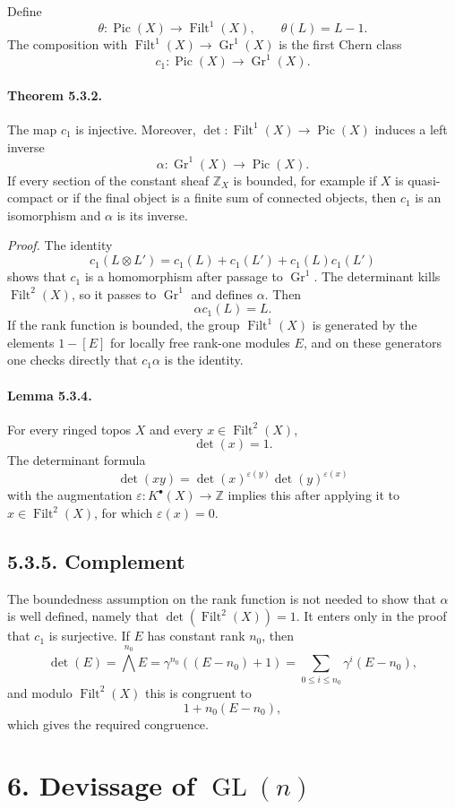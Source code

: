 \documentclass[12pt]{article}
\newcommand{\ZZ}{\mathbb Z}
\newcommand{\Pic}{\operatorname{Pic}}
\newcommand{\Gr}{\operatorname{Gr}}
\newcommand{\Filt}{\operatorname{Filt}}
\newcommand{\detm}{\det}
\newcommand{\Gl}{\operatorname{GL}}
\newcommand{\longto}{\longrightarrow}
\newcommand{\eps}{\varepsilon}
\begin{document}
Define
\[
\theta:\Pic(X)\longto\Filt^1(X),\qquad \theta(L)=L-1.
\]
The composition with $\Filt^1(X)\to\Gr^1(X)$ is the first Chern class
\[
c_1:\Pic(X)\longto\Gr^1(X).
\]

\paragraph{Theorem 5.3.2.}
The map $c_1$ is injective. Moreover, $\detm:\Filt^1(X)\to\Pic(X)$ induces a left inverse
\[
\alpha:\Gr^1(X)\longto\Pic(X).
\]
If every section of the constant sheaf $\ZZ_X$ is bounded, for example if $X$ is quasi-compact or if the final object is a finite sum of connected objects, then $c_1$ is an isomorphism and $\alpha$ is its inverse.

\emph{Proof.}
The identity
\[
c_1(L\otimes L')=c_1(L)+c_1(L')+c_1(L)c_1(L')
\]
shows that $c_1$ is a homomorphism after passage to $\Gr^1$. The determinant kills $\Filt^2(X)$, so it passes to $\Gr^1$ and defines $\alpha$. Then
\[
\alpha c_1(L)=L.
\]
If the rank function is bounded, the group $\Filt^1(X)$ is generated by the elements $1-[E]$ for locally free rank-one modules $E$, and on these generators one checks directly that $c_1\alpha$ is the identity.

\paragraph{Lemma 5.3.4.}
For every ringed topos $X$ and every $x\in\Filt^2(X)$,
\[
\detm(x)=1.
\]
The determinant formula
\[
\detm(xy)=\detm(x)^{\eps(y)}\detm(y)^{\eps(x)}
\]
with the augmentation $\eps:K^\bullet(X)\to\ZZ$ implies this after applying it to $x\in\Filt^2(X)$, for which $\eps(x)=0$.

\subsection*{5.3.5. Complement}

The boundedness assumption on the rank function is not needed to show that $\alpha$ is well defined, namely that $\detm(\Filt^2(X))=1$. It enters only in the proof that $c_1$ is surjective. If $E$ has constant rank $n_0$, then
\[
\detm(E)=\bigwedge^{n_0}E
      =\gamma^{n_0}((E-n_0)+1)
      =\sum_{0\leq i\leq n_0}\gamma^i(E-n_0),
\]
and modulo $\Filt^2(X)$ this is congruent to
\[
1+n_0(E-n_0),
\]
which gives the required congruence.

\section*{6. Devissage of $\Gl(n)$}
\end{document}
